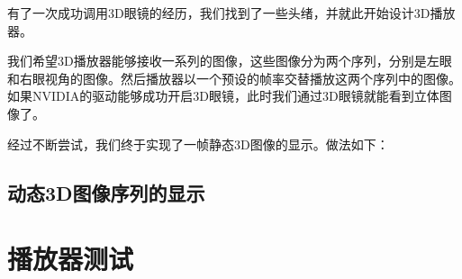 有了一次成功调用3D眼镜的经历，我们找到了一些头绪，并就此开始设计3D播放器。

我们希望3D播放器能够接收一系列的图像，这些图像分为两个序列，分别是左眼和右眼视角的图像。然后播放器以一个预设的帧率交替播放这两个序列中的图像。如果NVIDIA的驱动能够成功开启3D眼镜，此时我们通过3D眼镜就能看到立体图像了。

经过不断尝试，我们终于实现了一帧静态3D图像的显示。做法如下：


\subsection{动态3D图像序列的显示}
\label{subsec:motion3dimgdisp}



\section{播放器测试}
\label{sec:3dplayerdemo}


